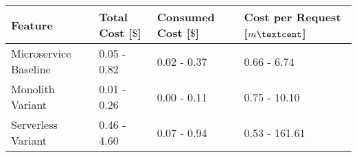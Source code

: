 \begin{tabular}{llll}
\toprule
Feature & Total Cost [$\$$] & Consumed Cost [$\$$] & Cost per Request [$m\textcent$] \\
\midrule
Microservice Baseline & 0.05 - 0.82 & 0.02 - 0.37 & 0.66 - 6.74 \\
Monolith Variant & 0.01 - 0.26 & 0.00 - 0.11 & 0.75 - 10.10 \\
Serverless Variant & 0.46 - 4.60 & 0.07 - 0.94 & 0.53 - 161.61 \\
\bottomrule
\end{tabular}
